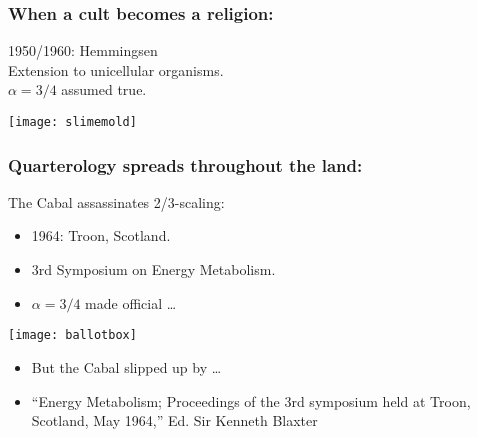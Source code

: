 \begin{frame}
  \frametitle{When a cult becomes a religion:}

  1950/1960: Hemmingsen\cite{hemmingsen1950a,hemmingsen1960a}\\
  Extension to unicellular organisms.\\
  $\alpha=3/4$ assumed true.

  \begin{center}
    \texttt{[image: slimemold]}
  \end{center}

\end{frame}

\begin{frame}
  \frametitle{Quarterology spreads throughout the land:}

  \small
  \begin{block}{The Cabal assassinates 2/3-scaling:}
    \begin{itemize}
    \item 
      1964: Troon, Scotland.
    \item 
      3rd Symposium on Energy Metabolism.
    \item 
      $\alpha=3/4$ made official \ldots \hfill {}
    \end{itemize}

    \begin{center}
      \texttt{[image: ballotbox]}
    \end{center}

    \begin{itemize}
    \item<3->
      But the Cabal slipped up by  \ldots
    \item<4->
      ``Energy Metabolism; Proceedings of the 3rd symposium
      held at Troon, Scotland, May 1964,''
      Ed. Sir Kenneth Blaxter\cite{blaxter1965a}
    \end{itemize}
  \end{block}

\end{frame}

\begin{frame}

  \showtarotcards{0.35}{
    john-dory,
    overview,
    complex-networks,
    random-networks,
    scale-free-networks,
    small-world-networks,
    theory-six-degrees,
    landscapes-of-forking-paths,
    networks-of-blood,
    trees-of-reality,
    orders-of-streams,
    laws-of-branching,
    unknown-mechanism,
    law-of-optimal-forks,
    church-of-quarterology,
    truthicide,
}

\end{frame}


